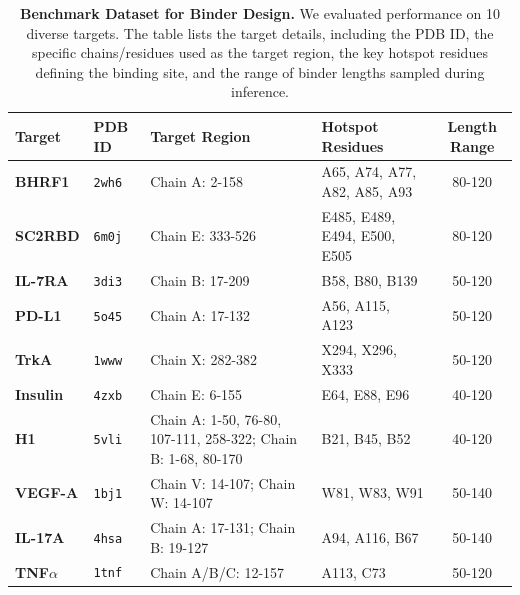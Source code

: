 \begin{table}[t]
\centering
\caption{\textbf{Benchmark Dataset for Binder Design.} 
We evaluated performance on 10 diverse targets. The table lists the target details, including the PDB ID, the specific chains/residues used as the target region, the key hotspot residues defining the binding site, and the range of binder lengths sampled during inference.}
\label{tab:targets}
\small 
\begin{tabularx}{\textwidth}{l l >{\raggedright\arraybackslash}X >{\raggedright\arraybackslash}X c}
\toprule
\textbf{Target} & \textbf{PDB ID} & \textbf{Target Region} & \textbf{Hotspot Residues} & \textbf{Length Range} \\
\midrule
\textbf{BHRF1}      & \texttt{2wh6} & Chain A: 2-158 & A65, A74, A77, A82, A85, A93 & 80-120 \\
\textbf{SC2RBD}     & \texttt{6m0j} & Chain E: 333-526 & E485, E489, E494, E500, E505 & 80-120 \\
\textbf{IL-7RA}     & \texttt{3di3} & Chain B: 17-209 & B58, B80, B139 & 50-120 \\
\textbf{PD-L1}      & \texttt{5o45} & Chain A: 17-132 & A56, A115, A123 & 50-120 \\
\textbf{TrkA}       & \texttt{1www} & Chain X: 282-382 & X294, X296, X333 & 50-120 \\
\textbf{Insulin}    & \texttt{4zxb} & Chain E: 6-155 & E64, E88, E96 & 40-120 \\
\textbf{H1}         & \texttt{5vli} & Chain A: 1-50, 76-80, 107-111, 258-322; Chain B: 1-68, 80-170 & B21, B45, B52 & 40-120 \\
\textbf{VEGF-A}     & \texttt{1bj1} & Chain V: 14-107; Chain W: 14-107 & W81, W83, W91 & 50-140 \\
\textbf{IL-17A}     & \texttt{4hsa} & Chain A: 17-131; Chain B: 19-127 & A94, A116, B67 & 50-140 \\
\textbf{TNF$\alpha$}& \texttt{1tnf} & Chain A/B/C: 12-157 & A113, C73 & 50-120 \\
\bottomrule
\end{tabularx}
\end{table}